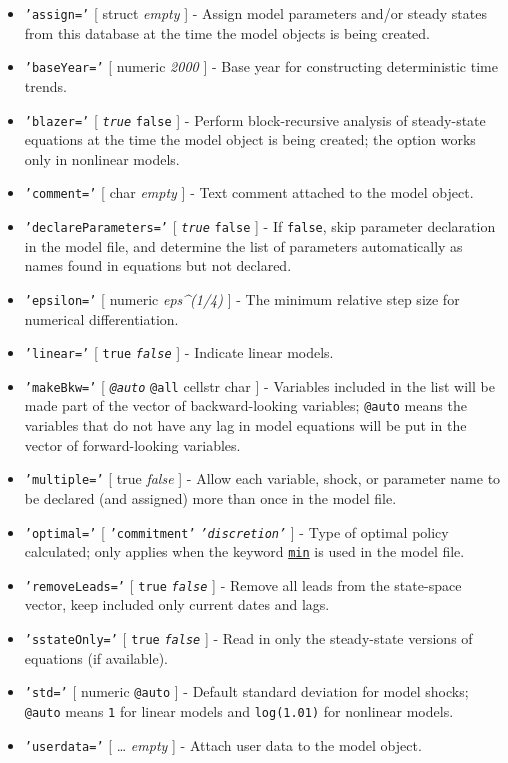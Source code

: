 \begin{itemize}
\item
  \texttt{'assign='} {[} struct \textbar{} \emph{empty} {]} - Assign
  model parameters and/or steady states from this database at the time
  the model objects is being created.
\item
  \texttt{'baseYear='} {[} numeric \textbar{} \emph{2000} {]} - Base
  year for constructing deterministic time trends.
\item
  \texttt{'blazer='} {[} \emph{\texttt{true}} \textbar{} \texttt{false}
  {]} - Perform block-recursive analysis of steady-state equations at
  the time the model object is being created; the option works only in
  nonlinear models.
\item
  \texttt{'comment='} {[} char \textbar{} \emph{empty} {]} - Text
  comment attached to the model object.
\item
  \texttt{'declareParameters='} {[} \emph{\texttt{true}} \textbar{}
  \texttt{false} {]} - If \texttt{false}, skip parameter declaration in
  the model file, and determine the list of parameters automatically as
  names found in equations but not declared.
\item
  \texttt{'epsilon='} {[} numeric \textbar{} \emph{eps\^{}(1/4)} {]} -
  The minimum relative step size for numerical differentiation.
\item
  \texttt{'linear='} {[} \texttt{true} \textbar{} \emph{\texttt{false}}
  {]} - Indicate linear models.
\item
  \texttt{'makeBkw='} {[} \emph{\texttt{@auto}} \textbar{} \texttt{@all}
  \textbar{} cellstr \textbar{} char {]} - Variables included in the
  list will be made part of the vector of backward-looking variables;
  \texttt{@auto} means the variables that do not have any lag in model
  equations will be put in the vector of forward-looking variables.
\item
  \texttt{'multiple='} {[} true \textbar{} \emph{false} {]} - Allow each
  variable, shock, or parameter name to be declared (and assigned) more
  than once in the model file.
\item
  \texttt{'optimal='} {[} \texttt{'commitment'} \textbar{}
  \emph{\texttt{'discretion'}} {]} - Type of optimal policy calculated;
  only applies when the keyword \href{modellang/min}{\texttt{min}} is
  used in the model file.
\item
  \texttt{'removeLeads='} {[} \texttt{true} \textbar{}
  \emph{\texttt{false}} {]} - Remove all leads from the state-space
  vector, keep included only current dates and lags.
\item
  \texttt{'sstateOnly='} {[} \texttt{true} \textbar{}
  \emph{\texttt{false}} {]} - Read in only the steady-state versions of
  equations (if available).
\item
  \texttt{'std='} {[} numeric \textbar{} \texttt{@auto} {]} - Default
  standard deviation for model shocks; \texttt{@auto} means \texttt{1}
  for linear models and \texttt{log(1.01)} for nonlinear models.
\item
  \texttt{'userdata='} {[} \ldots{} \textbar{} \emph{empty} {]} - Attach
  user data to the model object.
\end{itemize}

